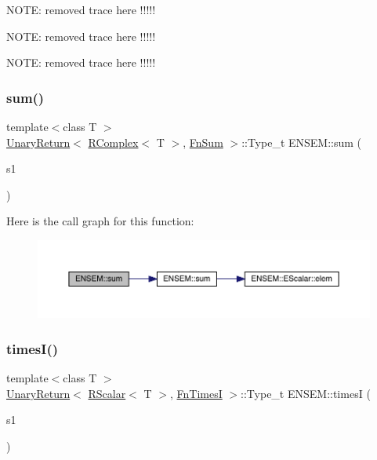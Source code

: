 N\+O\+TE\+: removed trace here !!!!!

N\+O\+TE\+: removed trace here !!!!!

N\+O\+TE\+: removed trace here !!!!! \mbox{\label{group__rcomplex_ga402ccaab21c1a8ce0e99c8d2b1ee1c53}} 
\subsubsection{\texorpdfstring{sum()}{sum()}}
{\footnotesize\ttfamily template$<$class T $>$ \\
\mbox{\hyperlink{structENSEM_1_1UnaryReturn}{Unary\+Return}}$<$ \mbox{\hyperlink{classENSEM_1_1RComplex}{R\+Complex}}$<$ T $>$, \mbox{\hyperlink{structENSEM_1_1FnSum}{Fn\+Sum}} $>$\+::Type\+\_\+t E\+N\+S\+E\+M\+::sum (\begin{DoxyParamCaption}\item[{const \mbox{\hyperlink{classENSEM_1_1RComplex}{R\+Complex}}$<$ T $>$ \&}]{s1 }\end{DoxyParamCaption})\hspace{0.3cm}{\ttfamily [inline]}}

Here is the call graph for this function\+:\nopagebreak
\begin{figure}[H]
\begin{center}
\leavevmode
\includegraphics[width=350pt]{da/dc7/group__rcomplex_ga402ccaab21c1a8ce0e99c8d2b1ee1c53_cgraph}
\end{center}
\end{figure}
\mbox{\label{group__rcomplex_ga1741ab434937b21a3f54881161f429aa}} 
\subsubsection{\texorpdfstring{timesI()}{timesI()}\hspace{0.1cm}{\footnotesize\ttfamily [1/2]}}
{\footnotesize\ttfamily template$<$class T $>$ \\
\mbox{\hyperlink{structENSEM_1_1UnaryReturn}{Unary\+Return}}$<$ \mbox{\hyperlink{classENSEM_1_1RScalar}{R\+Scalar}}$<$ T $>$, \mbox{\hyperlink{structENSEM_1_1FnTimesI}{Fn\+TimesI}} $>$\+::Type\+\_\+t E\+N\+S\+E\+M\+::timesI (\begin{DoxyParamCaption}\item[{const \mbox{\hyperlink{classENSEM_1_1RScalar}{R\+Scalar}}$<$ T $>$ \&}]{s1 }\end{DoxyParamCaption})\hspace{0.3cm}{\ttfamily [inline]}}


